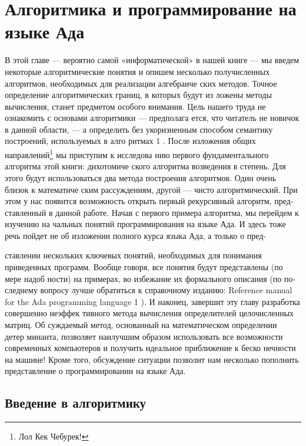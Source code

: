\documentclass{mai_book}
\begin{document}
\chapter{Алгоритмика и \newline программирование на \newline языке Ада}

В этой главе — вероятно самой «информатической» в нашей книге —
мы введем некоторые алгоритмические понятия и опишем несколько
получисленных алгоритмов, необходимых для реализации алгебраиче­
ских методов.
Точное определение алгоритмических границ, в которых будут из­
ложены методы вычисления, станет предметом особого внимания. Цель
нашего труда не ознакомить с основами алгоритмики — предполага­
ется, что читатель не новичок в данной области, — а определить без­
укоризненным способом семантику построений, используемых в алго­
ритмах 1 .
После изложения общих направлений\footnote{Лол Кек Чебурек!} мы приступим к исследова­
нию первого фундаментального алгоритма этой книги: дихотомиче­
ского алгоритма возведения в степень. Для этого будут использоваться
два метода построения алгоритмов. Один очень близок к математиче­
ским рассуждениям, другой — чисто алгоритмический. При этом у нас
появится возможность открыть первый рекурсивный алгоритм, пред­
ставленный в данной работе.
Начав с первого примера алгоритма, мы перейдем к изучению на­
чальных понятий программирования на языке Ада. И здесь тоже речь
пойдет не об изложении полного курса языка Ада, а только о пред-

\pagebreak

ставлении нескольких ключевых понятий, необходимых для понимания
приведенных программ.
Вообще говоря, все понятия будут представлены (по мере надоб­
ности) на примерах, во избежание их формального описания (по по­
следнему вопросу лучше обратиться к справочному изданию: Reference
manual for the Ada programming language 1 ).
И наконец, завершит эту главу разработка совершенно неэффек­
тивного метода вычисления определителей целочисленных матриц. Об­
суждаемый метод, основанный на математическом определении детер­
минанта, позволяет наилучшим образом использовать все возможности
современных компьютеров и получить идеальное приближение к беско­
нечности на машине! Кроме того, обсуждение ситуации позволит нам
несколько пополнить представление о программировании на языке Ада.

\section{Введение в алгоритмику}
\end{document}
